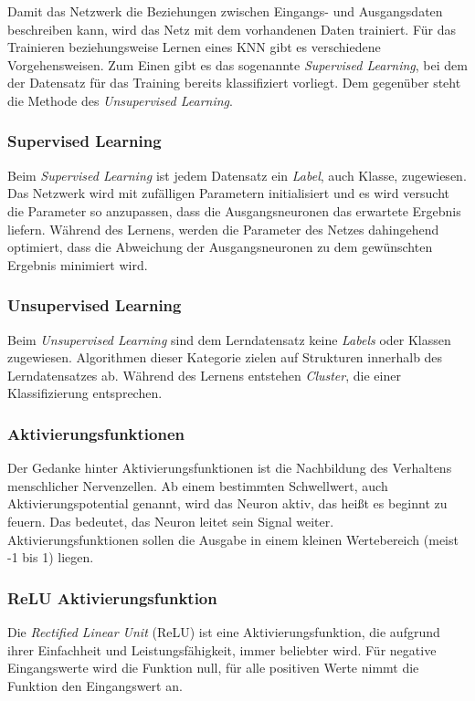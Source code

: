 \documentclass[11pt]{article}
\begin{document}
Damit das Netzwerk die Beziehungen zwischen Eingangs- und Ausgangsdaten beschreiben kann, wird das Netz mit dem vorhandenen Daten trainiert. Für das Trainieren beziehungsweise Lernen eines KNN gibt es verschiedene Vorgehensweisen. Zum Einen gibt es das sogenannte \textit{Supervised Learning}, bei dem der Datensatz für das Training bereits klassifiziert vorliegt. Dem gegenüber steht die Methode des \textit{Unsupervised Learning}.

\subsubsection*{Supervised Learning}
Beim \textit{Supervised Learning} ist jedem Datensatz ein \textit{Label}, auch Klasse, zugewiesen. Das Netzwerk wird mit zufälligen Parametern initialisiert und es wird versucht die Parameter so anzupassen, dass die Ausgangsneuronen das erwartete Ergebnis liefern. Während des Lernens, werden die Parameter des Netzes dahingehend optimiert, dass die Abweichung der Ausgangsneuronen zu dem gewünschten Ergebnis minimiert wird.\parencite{Pattanayak2017}

\subsubsection*{Unsupervised Learning}
Beim \textit{Unsupervised Learning} sind dem Lerndatensatz keine \textit{Labels} oder Klassen zugewiesen. Algorithmen dieser Kategorie zielen auf Strukturen innerhalb des Lerndatensatzes ab. Während des Lernens entstehen \textit{Cluster}, die einer Klassifizierung entsprechen.\parencite{Pattanayak2017}

\subsubsection{Aktivierungsfunktionen}
Der Gedanke hinter Aktivierungsfunktionen ist die Nachbildung des Verhaltens menschlicher Nervenzellen. Ab einem bestimmten Schwellwert, auch Aktivierungspotential  genannt, wird das Neuron aktiv, das heißt es beginnt zu feuern. Das bedeutet, das Neuron leitet sein Signal weiter. Aktivierungsfunktionen sollen die Ausgabe in einem kleinen Wertebereich (meist -1 bis 1) liegen.\parencite{Manaswi2018}

\subsubsection*{ReLU Aktivierungsfunktion}
Die \textit{Rectified Linear Unit} (ReLU) ist eine Aktivierungsfunktion, die aufgrund ihrer Einfachheit und Leistungsfähigkeit, immer beliebter wird. Für negative Eingangswerte wird die Funktion null, für alle positiven Werte nimmt die Funktion den Eingangswert an.\parencite{M.AnderssonM.Arvola}
\end{document}
